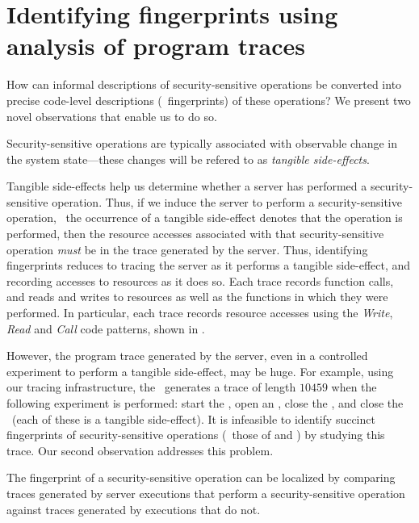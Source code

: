 \section{Identifying fingerprints using analysis of program traces}
\label{chapter:dynamic:fingerprint}

How can informal descriptions of security-sensitive operations be converted
into precise code-level descriptions (\ie~fingerprints) of these operations?
We present two novel observations that enable us to do so.

\begin{observation}
%
Security-sensitive operations are typically associated with observable change
in the system state---these changes will be refered to as \textit{tangible
side-effects}.
%
\end{observation}

Tangible side-effects help us determine whether a server has performed a
security-sensitive operation. Thus, if we induce the server to perform a
security-sensitive operation, \ie~the occurrence of a tangible side-effect
denotes that the operation is performed, then the resource accesses associated
with that security-sensitive operation \textit{must} be in the trace generated
by the server.  Thus, identifying fingerprints reduces to tracing the server as
it performs a tangible side-effect, and recording accesses to resources as it
does so. Each trace records function calls, and reads and writes to resources
as well as the functions in which they were performed. In particular, each
trace records resource accesses using the \textit{Write}, \textit{Read} and
\textit{Call} code patterns, shown in .

However, the program trace generated by the server, even in a controlled
experiment to perform a tangible side-effect, may be huge. For example, using 
our tracing infrastructure, the \xserver\ generates a trace of length $10459$
when the following experiment is performed: start the \xserver, open an
, close the , and close the \xserver\ (each of these is
a tangible side-effect). It is infeasible to identify succinct fingerprints of
security-sensitive operations (\eg~those of  and
) by studying this trace.  Our second observation addresses
this problem.

\begin{observation}
%
The fingerprint of a security-sensitive operation can be localized by comparing
traces generated by server executions that perform a security-sensitive
operation against traces generated by executions that do not.
%
\end{observation}

